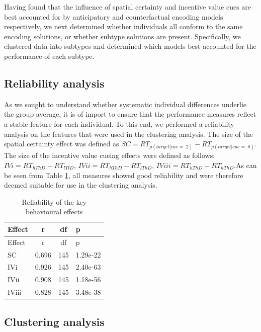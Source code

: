 \documentclass[11pt,halfline,a4paper,]{ouparticle}
\begin{document}
Having found that the influence of spatial certainty and incentive value cues are best accounted for by anticipatory and counterfactual encoding models respectively, we next determined whether individuals all conform to the same encoding solutions, or whether subtype solutions are present. Specifically, we clustered data into subtypes and determined which models best accounted for the performance of each subtype.

\hypertarget{reliability-analysis}{%
\subsection{Reliability analysis}\label{reliability-analysis}}

\label{sec:RelAnalysis}

As we sought to understand whether systematic individual differences underlie the group average, it is of import to ensure that the performance measures reflect a stable feature for each individual. To this end, we performed a reliability analysis on the features that were used in the clustering analysis. The size of the spatial certainty effect was defined as \(SC = RT_{p(target|cue = .2)} - RT_{p(target|cue = .8)}\). The size of the incentive value cueing effects were defined as follows: \(IVi = RT_{hThD} - RT_{lTlD}\), \(IVii = RT_{hThD} - RT_{lThD}\), \(IViii = RT_{hThD} - RT_{hThD}\).As can be seen from Table \ref{tab:reliabilityanalysis}, all measures showed good reliability and were therefore deemed suitable for use in the clustering analysis.

\begin{longtable}[]{@{}lccl@{}}
\caption{\label{tab:reliabilityanalysis}Reliability of the key behavioural effects}\tabularnewline
\toprule
Effect & r & df & p\tabularnewline
\midrule
\endfirsthead
\toprule
Effect & r & df & p\tabularnewline
\midrule
\endhead
SC & 0.696 & 145 & 1.29e-22\tabularnewline
IVi & 0.926 & 145 & 2.40e-63\tabularnewline
IVii & 0.908 & 145 & 1.18e-56\tabularnewline
IViii & 0.828 & 145 & 3.48e-38\tabularnewline
\bottomrule
\end{longtable}

\hypertarget{clustering-analysis}{%
\subsection{Clustering analysis}\label{clustering-analysis}}

\label{sec:ClusAnalysis}
\end{document}
